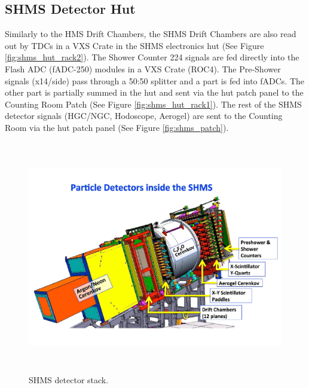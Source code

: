 \documentclass[11pt]{article}
\begin{document}
\subsection{SHMS Detector Hut}
Similarly to the HMS Drift Chambers, the SHMS Drift Chambers are also read out by TDCs in a VXS Crate in the SHMS electronics hut (See Figure \ref{fig:shms_hut_rack2}).
The Shower Counter 224 signals are fed directly into the Flash ADC (fADC-250) modules in a VXS Crate (ROC4). The Pre-Shower signals (x14/side) pass
through a 50:50 splitter and a part is fed into fADCs. The other part is partially summed in the hut and sent via the hut patch panel to the
Counting Room Patch (See Figure \ref{fig:shms_hut_rack1}). The rest of the SHMS detector signals (HGC/NGC, Hodoscope, Aerogel) are sent to the Counting Room via the hut patch panel (See Figure \ref{fig:shms_patch}). 
\newpage
\begin{figure}[h!]
  \centering
  \includegraphics[width=6.0in, height=4.0in]{../SHMS_stack.pdf}
  \caption{SHMS detector stack.}
  \label{fig:shms_stack}
\end{figure}
\end{document}

